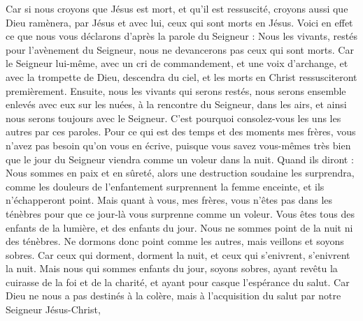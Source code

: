 \begin{multicols}{2}
Car si nous croyons que Jésus est mort, et qu'il est ressuscité, croyons aussi que Dieu ramènera, par Jésus et avec lui, ceux qui sont morts en Jésus.
Voici en effet ce que nous vous déclarons d’après la parole du Seigneur : Nous les vivants, restés pour l’avènement du Seigneur, nous ne devancerons pas ceux qui sont morts.
Car le Seigneur lui-même, avec un cri de commandement, et une voix d'archange, et avec la trompette de Dieu, descendra du ciel, et les morts en Christ ressusciteront premièrement.
Ensuite, nous les vivants qui serons restés, nous serons ensemble enlevés avec eux sur les nuées, à la rencontre du Seigneur, dans les airs, et ainsi nous serons toujours avec le Seigneur.
C'est pourquoi consolez-vous les uns les autres par ces paroles.
\VerseOne{}Pour ce qui est des temps et des moments mes frères, vous n'avez pas besoin qu'on vous en écrive,
puisque vous savez vous-mêmes très bien que le jour du Seigneur viendra comme un voleur dans la nuit.
Quand ils diront : Nous sommes en paix et en sûreté, alors une destruction soudaine les surprendra, comme les douleurs de l’enfantement surprennent la femme enceinte, et ils n’échapperont point.
Mais quant à vous, mes frères, vous n'êtes pas dans les ténèbres pour que ce jour-là vous surprenne comme un voleur.
Vous êtes tous des enfants de la lumière, et des enfants du jour. Nous ne sommes point de la nuit ni des ténèbres.
Ne dormons donc point comme les autres, mais veillons et soyons sobres.
Car ceux qui dorment, dorment la nuit, et ceux qui s'enivrent, s'enivrent la nuit.
Mais nous qui sommes enfants du jour, soyons sobres, ayant revêtu la cuirasse de la foi et de la charité, et ayant pour casque l'espérance du salut.
Car Dieu ne nous a pas destinés à la colère, mais à l'acquisition du salut par notre Seigneur Jésus-Christ,

\end{multicols}
